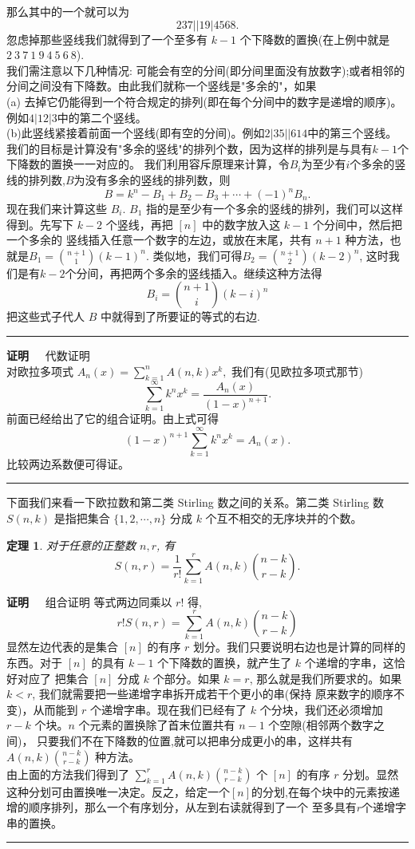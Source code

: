 \documentclass[a4paper,11pt,twoside]{book}
\newtheorem{thm}{定理}[section]
\def\qed{\nopagebreak\hfill{\rule{4pt}{7pt}}\medbreak}
\def\pf{{\bf 证明~~ }}
\begin{document}
那么其中的一个就可以为 $$237||19|4568.$$
忽虑掉那些竖线我们就得到了一个至多有 $k-1$
个下降数的置换(在上例中就是 $2~3~7~1~9~4~5~6~8$).
\\我们需注意以下几种情况:
可能会有空的分间(即分间里面没有放数字);或者相邻的分间之间没有下降数。由此我们就称一个竖线是"多余的"，如果
\\(a)
去掉它仍能得到一个符合规定的排列(即在每个分间中的数字是递增的顺序)。例如$4|12|3$中的第二个竖线。
\\(b)此竖线紧接着前面一个竖线(即有空的分间)。例如$2|35||614$中的第三个竖线。
我们的目标是计算没有"多余的竖线"的排列个数，因为这样的排列是与具有$k-1$个下降数的置换一一对应的。
我们利用容斥原理来计算，令$B_i$为至少有$i$个多余的竖线的排列数,$B$为没有多余的竖线的排列数，则
$$
B=k^n-B_1+B_2-B_3+\cdots +(-1)^nB_n.
$$
现在我们来计算这些 $B_i$. $B_1$
指的是至少有一个多余的竖线的排列，我们可以这样得到。先写下 $k-2$
个竖线，再把 $[n]$ 中的数字放入这 $k-1$ 个分间中，然后把一个多余的
竖线插入任意一个数字的左边，或放在末尾，共有 $n+1$
种方法，也就是$B_1={n+1 \choose 1}(k-1)^n$.
类似地，我们可得$B_2={n+1 \choose 2}(k-2)^n$,
这时我们是有$k-2$个分间，再把两个多余的竖线插入。继续这种方法得$$B_i={n+1
\choose i}(k-i)^n$$把这些式子代人 $B$
中就得到了所要证的等式的右边.\qed


\pf {代数证明}\\
 对欧拉多项式 $A_n(x)=\sum\limits^n_{k=1}A(n,k)x^k,$
我们有(见欧拉多项式那节)
$$\sum\limits^{\infty}_{k=1}k^nx^k=\frac{A_n(x)}{(1-x)^{n+1}}.$$
前面已经给出了它的组合证明。由上式可得$$(1-x)^{n+1}\sum\limits^{\infty}_{k=1}k^nx^k=A_n(x).$$
比较两边系数便可得证。\qed

下面我们来看一下欧拉数和第二类 Stirling 数之间的关系。第二类
Stirling 数 $S(n,k)$ 是指把集合 $\{1,2,\cdots,n\}$ 分成 $k$
个互不相交的无序块并的个数。

\begin{thm}
对于任意的正整数 $n,r$, 有
\begin{equation}
S(n,r)=\frac{1}{r!}\sum_{k=1}^{r}A(n,k){n-k\choose r-k}.
\end{equation}
\end{thm}

\pf{组合证明}
 等式两边同乘以
$r!$ 得, $$r!S(n,r)=\sum_{k=1}^{r}A(n,k){n-k\choose r-k}$$
显然左边代表的是集合 $[n]$ 的有序 $r$
划分。我们只要说明右边也是计算的同样的东西。对于 $[n]$ 的具有 $k-1$
个下降数的置换，就产生了 $k$ 个递增的字串，这恰好对应了 把集合 $[n]$
分成 $k$ 个部分。如果 $k=r$, 那么就是我们所要求的。如果 $k<r$,
我们就需要把一些递增字串拆开成若干个更小的串(保持
原来数字的顺序不变)，从而能到 $r$ 个递增字串。现在我们已经有了 $k$
个分块，我们还必须增加 $r-k$ 个块。$n$ 个元素的置换除了首末位置共有
$n-1$ 个空隙(相邻两个数字之间)，
只要我们不在下降数的位置,就可以把串分成更小的串，这样共有$A(n,k){n-k\choose
r-k}$ 种方法。
\\由上面的方法我们得到了 $\sum_{k=1}^{r}A(n,k){n-k\choose
r-k}$ 个 $[n]$ 的有序 $r$
分划。显然这种分划可由置换唯一决定。反之，给定一个$[n]$的分划,在每个块中的元素按递增的顺序排列，那么一个有序划分，从左到右读就得到了一个
至多具有$r$个递增字串的置换。\qed
\end{document}
